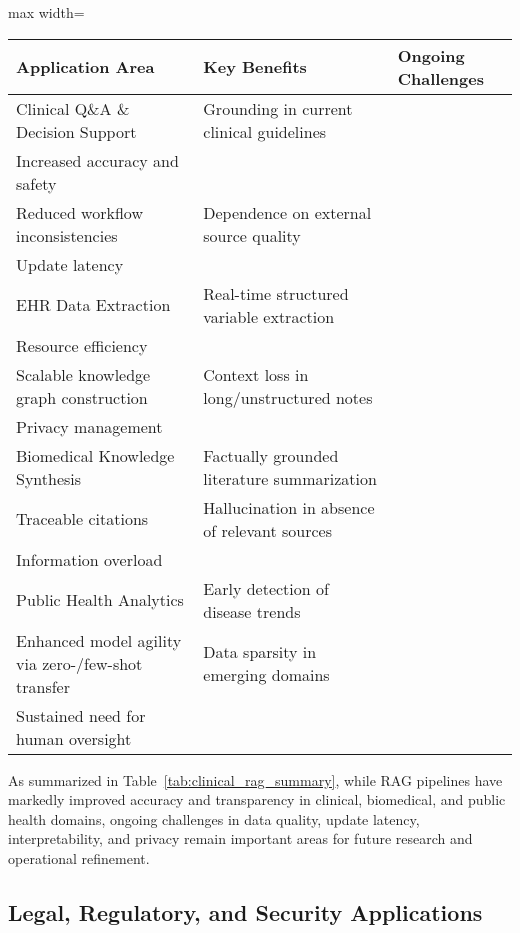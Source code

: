 \documentclass[sigconf]{acmart}
\begin{document}
\begin{table*}[htbp]
\centering
\caption{Summary of Key Benefits and Ongoing Challenges of RAG in Clinical Applications}
\label{tab:clinical_rag_summary}
\begin{adjustbox}{max width=\textwidth}
\begin{tabular}{lll}
\toprule
\textbf{Application Area} & \textbf{Key Benefits} & \textbf{Ongoing Challenges} \\
\midrule
Clinical Q\&A \& Decision Support & 
Grounding in current clinical guidelines\\
Increased accuracy and safety\\
Reduced workflow inconsistencies
& 
Dependence on external source quality\\
Update latency
\\
EHR Data Extraction & 
Real-time structured variable extraction\\
Resource efficiency\\
Scalable knowledge graph construction
& 
Context loss in long/unstructured notes\\
Privacy management
\\
Biomedical Knowledge Synthesis & 
Factually grounded literature summarization\\
Traceable citations
& 
Hallucination in absence of relevant sources\\
Information overload
\\
Public Health Analytics & 
Early detection of disease trends\\
Enhanced model agility via zero-/few-shot transfer
& 
Data sparsity in emerging domains\\
Sustained need for human oversight
\\
\bottomrule
\end{tabular}
\end{adjustbox}
\end{table*}

As summarized in Table~\ref{tab:clinical_rag_summary}, while RAG pipelines have markedly improved accuracy and transparency in clinical, biomedical, and public health domains, ongoing challenges in data quality, update latency, interpretability, and privacy remain important areas for future research and operational refinement.

\subsection{Legal, Regulatory, and Security Applications}
\end{document}
